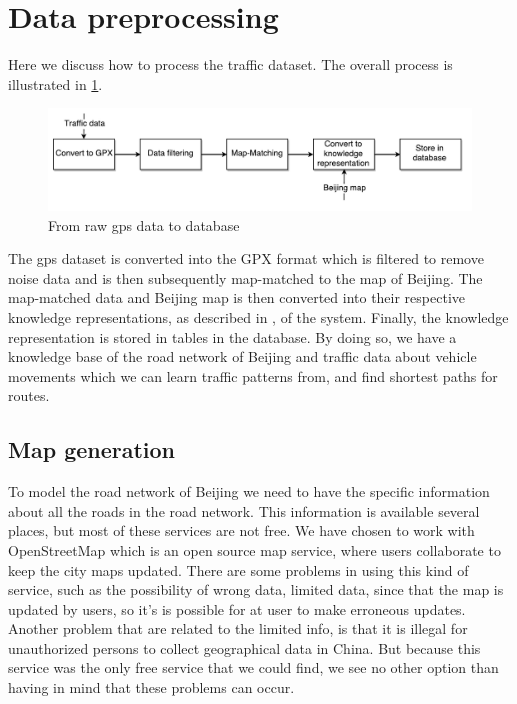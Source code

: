 \section{Data preprocessing}
Here we discuss how to process the traffic dataset. The overall process is illustrated in \ref{fig:data-processing}.

\begin{figure}[h!]
  \centering
    \includegraphics[width=1\textwidth]{figures/data_preprocessing.pdf}
    \caption{From raw gps data to database}
    \label{fig:data-processing}
\end{figure}

The gps dataset is converted into the GPX format which is filtered to remove noise data and is then subsequently map-matched to the map of Beijing. The map-matched data and Beijing map is then converted into their respective knowledge representations, as described in , of the system. Finally, the knowledge representation is stored in tables in the database. 
By doing so, we have a knowledge base of the road network of Beijing and traffic data about vehicle movements which we can learn traffic patterns from, and find shortest paths for routes.

\subsection{Map generation}\label{sec:mapgeneration}
To model the road network of Beijing we need to have the specific information about all the roads in the road network. This information is available several places, but most of these services are not free. We have chosen to work with OpenStreetMap which is an open source map service, where users collaborate to keep the city maps updated. There are some problems in using this kind of service, such as the possibility of wrong data, limited data, since that the map is updated by users, so it's is possible for at user to make erroneous updates. Another problem that are related to the limited info, is that it is illegal for unauthorized persons to collect geographical data in China\cite{chinamapillegal}. But because this service was the only free service that we could find, we see no other option than having in mind that these problems can occur. 

